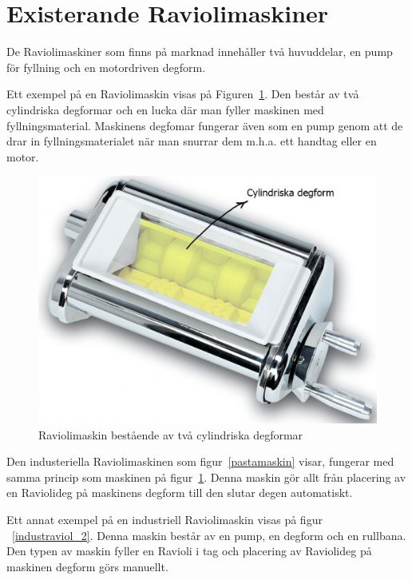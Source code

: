 \section{Existerande Raviolimaskiner}
De Raviolimaskiner som finns på marknad innehåller två huvuddelar, en pump för fyllning och en motordriven degform. 

Ett exempel på en Raviolimaskin visas på Figuren~\ref{raviolihemma}. Den består av två cylindriska degformar och en lucka där man fyller maskinen med fyllningsmaterial. Maskinens degfomar fungerar även som en pump genom att de drar in fyllningsmaterialet när man snurrar dem m.h.a. ett handtag eller en motor.
 	\begin{figure}[h]
 		\begin{center}
 			\includegraphics[scale=0.4]{images/ravioli_machine_comment.jpg}
 			\caption{Raviolimaskin bestående av två cylindriska degformar~\cite{raviolimaskinbutik} }
 			\label{raviolihemma}	
 		\end{center}
 	\end{figure}
 
Den industeriella Raviolimaskinen som figur~\ref{pastamaskin} visar, fungerar med samma princip som maskinen på figur~\ref{raviolihemma}. Denna maskin gör allt från placering av en Raviolideg på maskinens degform till den slutar degen automatiskt.

Ett annat exempel på en industriell Raviolimaskin visas på figur ~\ref{industraviol_2}. Denna maskin består av en pump, en degform och en rullbana. Den typen av maskin fyller en Ravioli i tag och placering av Raviolideg på maskinen degform görs manuellt.
  
